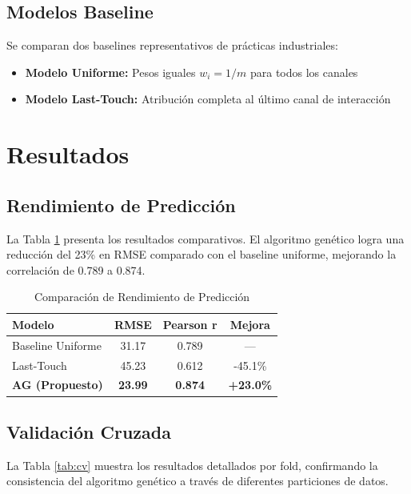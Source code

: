 \documentclass[conference]{IEEEtran}
\begin{document}
\subsection{Modelos Baseline}
Se comparan dos baselines representativos de prácticas industriales:
\begin{itemize}
    \item \textbf{Modelo Uniforme:} Pesos iguales $w_i = 1/m$ para todos los canales
    \item \textbf{Modelo Last-Touch:} Atribución completa al último canal de interacción
\end{itemize}

\section{Resultados}

\subsection{Rendimiento de Predicción}
La Tabla \ref{tab:results} presenta los resultados comparativos. El algoritmo genético logra una reducción del 23\% en RMSE comparado con el baseline uniforme, mejorando la correlación de 0.789 a 0.874.

\begin{table}[htbp]
\caption{Comparación de Rendimiento de Predicción}
\begin{center}
\begin{tabular}{lccc}
\toprule
\textbf{Modelo} & \textbf{RMSE} & \textbf{Pearson r} & \textbf{Mejora} \\
\midrule
Baseline Uniforme & 31.17 & 0.789 & — \\
Last-Touch & 45.23 & 0.612 & -45.1\% \\
\textbf{AG (Propuesto)} & \textbf{23.99} & \textbf{0.874} & \textbf{+23.0\%} \\
\bottomrule
\end{tabular}
\label{tab:results}
\end{center}
\end{table}

\subsection{Validación Cruzada}
La Tabla \ref{tab:cv} muestra los resultados detallados por fold, confirmando la consistencia del algoritmo genético a través de diferentes particiones de datos.
\end{document}
